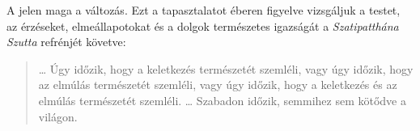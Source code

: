 A jelen maga a változás. Ezt a tapasztalatot éberen figyelve vizsgáljuk
a testet, az érzéseket, elmeállapotokat és a dolgok természetes
igazságát a \emph{Szatipatthána Szutta} refrénjét követve:

\begin{quote}
\ldots{} Úgy időzik, hogy a keletkezés természetét szemléli, vagy úgy
időzik, hogy az elmúlás természetét szemléli, vagy úgy időzik, hogy a
keletkezés és az elmúlás természetét szemléli. \ldots{} Szabadon időzik,
semmihez sem kötődve a világon.

\bigskip

\end{quote}
